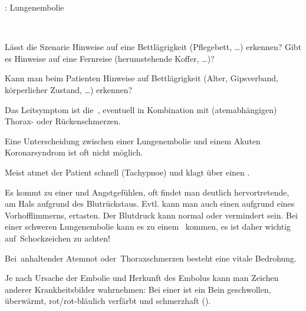 {\TxABCDE: Lungenembolie}
{~
\begin{ABCDEText}
  \item[\ABCDE{1}] Lässt die Szenarie Hinweise auf eine Bettlägrigkeit
  (Pflegebett, \ldots) erkennen? Gibt es Hinweise auf eine Fernreise (herumstehende Koffer, {\ldots})?
  \item[\ABCDE{2}] Kann man beim Patienten Hinweise auf Bettlägrigkeit (Alter,
  Gipsverband, körperlicher Zustand, \ldots) erkennen?
  \item[\ABCDE{4}] Das Leitsymptom ist die
  {\RedFlag}\,, eventuell in Kombination mit
  (atemabhängigen) {\RedFlag}\,Thorax- oder Rückenschmerzen. 
  
  Eine Unterscheidung zwischen einer Lungenembolie und
  einem Akuten Koronarsyndrom ist oft nicht möglich. 
  \item[\ABCDE{B}] Meist atmet der Patient schnell (Tachypnoe) und klagt über
  einen .
  \item[\ABCDE{C}]  Es kommt zu
  einer  und Angstgefühlen, oft findet man
  deutlich hervortretende, 
  am Hals aufgrund des Blutrückstaus. Evtl. kann man auch einen
   aufgrund eines Vorhofflimmerns, ertasten.
  Der Blutdruck kann normal oder vermindert sein. Bei einer
  schweren Lungenembolie kann es zu einem
  {\RedFlag}\, kommen, es ist daher
  wichtig auf {\RedFlag}\,Schockzeichen zu achten!
  \item[\ABCDE{=}] Bei {\RedFlag}\,anhaltender Atemnot oder
  {\RedFlag}\,Thoraxschmerzen besteht eine vitale Bedrohung.
  \item[\ABCDE{\ldots}] Je nach Ursache der Embolie und
  Herkunft des Embolus kann
  man Zeichen anderer Krankheitsbilder wahrnehmen: Bei einer
   ist ein Bein geschwollen,
  überwärmt, rot/rot-bläulich verfärbt und schmerzhaft
  ().
  
\end{ABCDEText}
}
